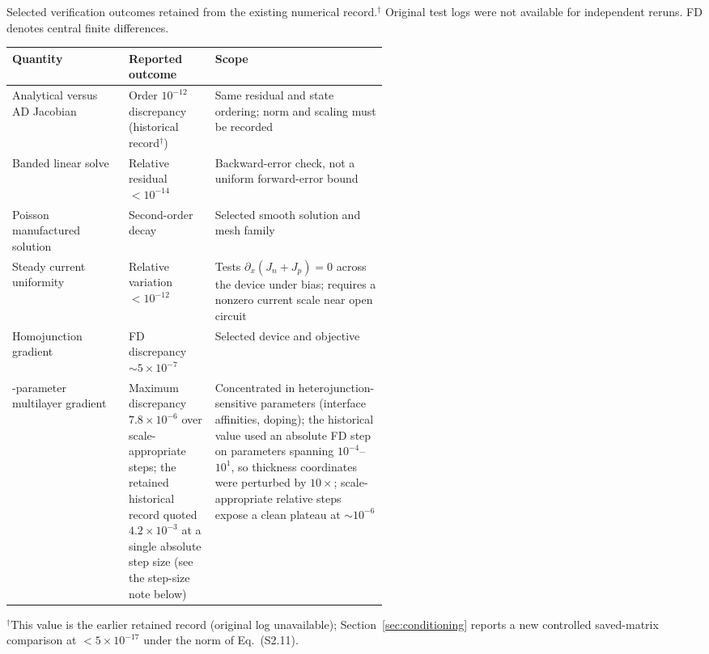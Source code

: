 \begin{papertable}
\centering\small
\caption{Selected verification outcomes retained from the existing
numerical record.$^{\dagger}$ Original test logs were not available for independent
reruns. FD denotes central finite differences.}
\label{tab:verification}
\begin{tabularx}{\linewidth}{@{}>{\raggedright\arraybackslash}p{0.31\linewidth}>{\raggedright\arraybackslash}p{0.23\linewidth}>{\raggedright\arraybackslash}X@{}}
\toprule
Quantity & Reported outcome & Scope \\
\midrule
Analytical versus AD Jacobian & Order $10^{-12}$ discrepancy (historical
record$^{\dagger}$) & Same
residual and state ordering; norm and scaling must be recorded \\
Banded linear solve & Relative residual $<10^{-14}$ & Backward-error
check, not a uniform forward-error bound \\
Poisson manufactured solution & Second-order decay & Selected smooth
solution and mesh family \\
Steady current uniformity & Relative variation $<10^{-12}$ & Tests
$\partial_x(J_n+J_p)=0$ across the device under bias; requires
a nonzero current scale near open circuit \\
Homojunction gradient & FD discrepancy $\sim5\times10^{-7}$ & Selected
device and objective \\
16-parameter multilayer gradient & Maximum discrepancy
$7.8\times10^{-6}$ over scale-appropriate steps; the retained historical
record quoted $4.2\times10^{-3}$ at a single absolute step size
(see the step-size note below) & Concentrated in heterojunction-sensitive
parameters (interface affinities, doping); the historical value used an
absolute FD step on parameters spanning $10^{-4}$--$10^{1}$, so thickness
coordinates were perturbed by $10\times$; scale-appropriate relative steps
expose a clean plateau at $\sim10^{-6}$ \\
\bottomrule
\end{tabularx}
\vspace{2pt}
\footnotesize{$^{\dagger}$This value is the earlier retained record (original log unavailable); Section~\ref{sec:conditioning} reports a new controlled saved-matrix comparison at ${<}5{\times}10^{-17}$ under the norm of Eq.~(S2.11).}
\end{papertable}


